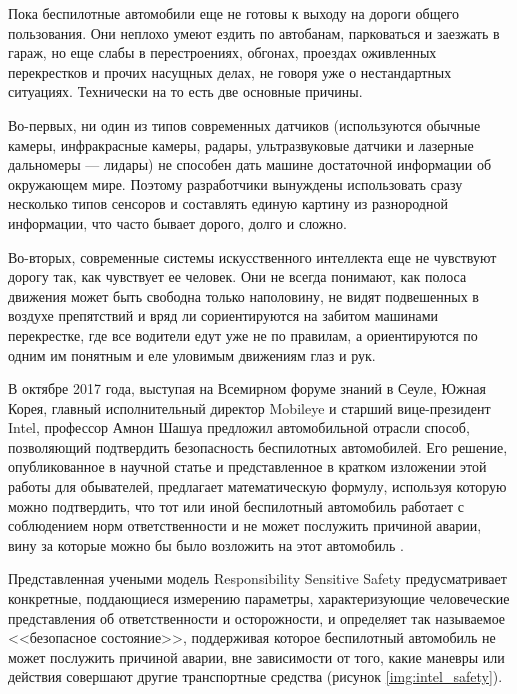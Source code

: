 Пока беспилотные автомобили еще не готовы к выходу на дороги общего пользования. Они 
неплохо умеют ездить по автобанам, парковаться и заезжать в гараж, но еще слабы 
в перестроениях, обгонах, проездах оживленных перекрестков и прочих насущных 
делах, не говоря уже о нестандартных ситуациях. Технически на то есть две 
основные причины.

Во-первых, ни один из типов современных датчиков (используются 
обычные камеры, инфракрасные камеры, радары, ультразвуковые датчики и лазерные 
дальномеры — лидары) не способен дать машине достаточной информации об 
окружающем мире. Поэтому разработчики вынуждены использовать сразу несколько 
типов сенсоров и составлять единую картину из разнородной информации, что часто 
бывает дорого, долго и сложно.

Во-вторых, современные системы искусственного интеллекта еще не чувствуют 
дорогу так, как чувствует ее человек. Они не всегда понимают, как полоса 
движения может быть свободна только наполовину, не видят подвешенных в воздухе 
препятствий и вряд ли сориентируются на забитом машинами перекрестке, где все 
водители едут уже не по правилам, а ориентируются по одним им понятным и еле 
уловимым движениям глаз и рук.


В октябре 2017 года, выступая на Всемирном форуме знаний в Сеуле, Южная Корея, 
главный исполнительный директор Mobileye и старший вице-президент Intel, 
профессор Амнон Шашуа предложил автомобильной отрасли способ, 
позволяющий подтвердить безопасность беспилотных автомобилей. Его решение, 
опубликованное в научной статье и представленное в кратком изложении этой 
работы для обывателей, предлагает математическую формулу, используя которую 
можно подтвердить, что тот или иной беспилотный автомобиль работает с 
соблюдением норм ответственности и не может послужить причиной аварии, вину за 
которые можно бы было возложить на этот автомобиль \cite{Intel_Safety}.

Представленная учеными модель Responsibility Sensitive Safety предусматривает 
конкретные, поддающиеся измерению параметры, характеризующие человеческие 
представления об ответственности и осторожности, и определяет так называемое 
<<безопасное состояние>>, поддерживая которое беспилотный автомобиль 
не может послужить причиной аварии, вне зависимости от того, какие маневры или 
действия совершают другие транспортные средства (рисунок \ref{img:intel_safety}).

